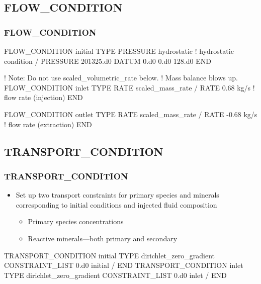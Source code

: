 \documentclass{beamer}
\newcommand\bluecomment[1]{{{\color{blue} #1}}}
\begin{document}
\subsection{FLOW\_CONDITION}

\begin{frame}\frametitle{\bf FLOW\_CONDITION}

\begin{semiverbatim}
FLOW_CONDITION initial
  TYPE
    PRESSURE hydrostatic \bluecomment{! hydrostatic condition}
  /
  PRESSURE 201325.d0
  DATUM 0.d0 0.d0 128.d0
END

\newpage
! Note: Do not use scaled_volumetric_rate below.  
!       Mass balance blows up.
FLOW_CONDITION inlet
  TYPE
    RATE scaled_mass_rate
  /
  RATE 0.68 kg/s \bluecomment{! flow rate (injection)}
END

FLOW_CONDITION outlet
  TYPE
    RATE scaled_mass_rate
  /
  RATE -0.68 kg/s \bluecomment{! flow rate (extraction)}
END

\end{semiverbatim}
\end{frame}

\subsection{TRANSPORT\_CONDITION}

\begin{frame}[fragile]\frametitle{\bf TRANSPORT\_CONDITION}
\vspace{-1mm}
\begin{itemize}
  \item Set up two transport constraints for primary species and minerals corresponding to initial conditions and injected fluid composition
   \begin{itemize}
     \item Primary species concentrations
     \item Reactive minerals---both primary and secondary
   \end{itemize}
\end{itemize}
\vspace{-3mm}
\begin{semiverbatim}
TRANSPORT_CONDITION initial
  TYPE dirichlet_zero_gradient
  CONSTRAINT_LIST
    0.d0 initial
  /
END
\vspace{-3mm}
TRANSPORT_CONDITION inlet
  TYPE dirichlet_zero_gradient
  CONSTRAINT_LIST
    0.d0 inlet
  /
END
\end{semiverbatim}
\end{frame}
\end{document}
